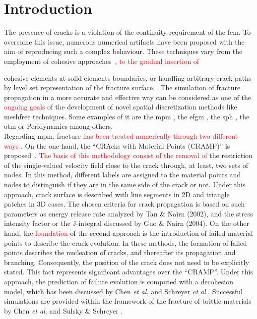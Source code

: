 \message{ !name(2020_EFM_MPM_Eigensoftening.tex)}\documentclass[preprint,12pt,a4paper]{elsarticle}
\newcommand{\PNA}[1]{
  \textcolor{red}{{#1}}
}
\begin{document}
\section{Introduction}
\label{sec:1}
The presence of cracks is a violation of the continuity requirement of the
\acrfull{fem}. To overcome this issue, numerous numerical
artifacts have been proposed with the aim of reproducing such a
complex behaviour. These techniques vary from the employment of cohesive
approaches~\cite{Barenblatt,Hilleborg_1976}, \PNA{to the gradual insertion of}
cohesive elements \cite{Ortiz_1999,Pandolfi_2002,Ruiz_2000} at solid
elements boundaries, or handling arbitrary crack paths by level set
representation of the fracture surface~\cite{Belytschko_03}. The
simulation of fracture propagation in a more accurate and effective
way can be considered as one of the \PNA{ongoing goals} of the development of novel spatial discretization methods like meshfree techniques. Some
examples of it are the \acrfull{mpm}
\cite{Schreyer_2002,Chen_2002,Nairn_2003,Zhenmao_2005}, the
\acrfull{efgm} \cite{BELYTSCHKO_1995,BELYTSCHKO_2000,Zhuang_2012,Muthu_2013}, the
\acrfull{sph} \cite{Wang_2020,Wang_2019}, the \acrfull{otm} \cite{Li2010,Li_2012,Pandolfi_2013,Li_2015} or Peridynamics
\cite{HA_2011,RABCZUK_2017} among others. \\

Regarding \acrshort{mpm}, fracture \PNA{has been treated numerically through two different ways}. On the one hand, the ``CRAcks with Material Points (CRAMP)'' is proposed~\cite{Nairn_2003,Nairn_2006}. \PNA{The basis of this methodology consist of the removal of} the restriction
of the single-valued velocity field close to the crack through, at least, two sets of nodes. In this method, different labels are assigned to the material points
and nodes to distinguish if they are in the same side of the crack or
not. Under this approach, crack surface is described with line segments
in 2D and triangle patches in 3D cases. The chosen criteria for crack
propagation is based on such parameters as energy release rate
analyzed by Tan \& Nairn (2002)\cite{Nairn_2002}, and the stress
intensity factor or the J-integral discussed by Guo \& Nairn
(2004)\cite{Nairn_2004}. 
On the other hand, the \PNA{foundation} of the second approach is the introduction of failed
material points to describe the crack evolution. In these methods, the
formation of failed points describes the nucleation of cracks, and
thereafter its propagation and branching. Consequently, the position
of the crack does not need to be explicitly stated. This fact represents
significant advantages over the ``CRAMP''. Under this approach, the
prediction of failure evolution is computed with a decohesion model,
which has been discussed by Chen {\it et al.}\cite{Zhenmao_2005} and
Schreyer {\it et al.}\cite{Schreyer_2002}. Successful simulations are provided within the framework of the fracture of brittle materials by Chen {\it et
  al.} \cite{Chen_2002,Chen_2003} and Sulsky \& Schreyer
\cite{Sulsky_2004}.\\
\end{document}
